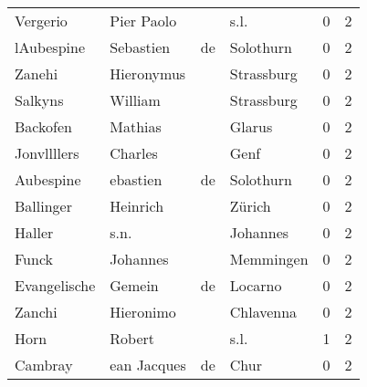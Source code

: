 \documentclass[10pt,a4paper,landscape]{article}
\begin{document}
\begin{longtable}{llllrr}
                 Vergerio &                         Pier Paolo &             &                                        s.l. &          0 &         2 \\
               lAubespine &                          Sebastien &          de &                                   Solothurn &          0 &         2 \\
                   Zanehi &                         Hieronymus &             &                                  Strassburg &          0 &         2 \\
                  Salkyns &                            William &             &                                  Strassburg &          0 &         2 \\
                 Backofen &                            Mathias &             &                                      Glarus &          0 &         2 \\
              Jonvllllers &                            Charles &             &                                        Genf &          0 &         2 \\
                Aubespine &                           ebastien &          de &                                   Solothurn &          0 &         2 \\
                Ballinger &                           Heinrich &             &                                      Zürich &          0 &         2 \\
                   Haller &                               s.n. &             &                                    Johannes &          0 &         2 \\
                    Funck &                           Johannes &             &                                   Memmingen &          0 &         2 \\
             Evangelische &                             Gemein &          de &                                     Locarno &          0 &         2 \\
                   Zanchi &                          Hieronimo &             &                                   Chlavenna &          0 &         2 \\
                     Horn &                             Robert &             &                                        s.l. &          1 &         2 \\
                  Cambray &                        ean Jacques &          de &                                        Chur &          0 &         2 \\

\end{longtable}
\end{document}
